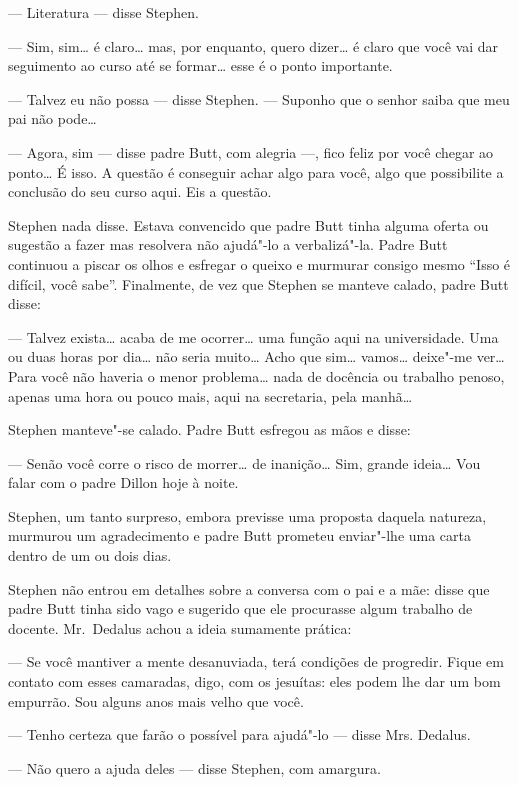 --- Literatura --- disse Stephen.

--- Sim, sim\ldots{} é claro\ldots{} mas, por enquanto, quero dizer\ldots{} é
claro que você vai dar seguimento ao curso até se formar\ldots{} esse é o
ponto importante.

--- Talvez eu não possa --- disse Stephen.  --- Suponho que o senhor
saiba que meu pai não pode\ldots{}

--- Agora, sim --- disse padre Butt, com alegria ---, fico feliz
por você chegar ao ponto\ldots{}  É isso.  A questão é conseguir achar algo
para você, algo que possibilite a conclusão do seu curso aqui.  Eis a
questão.

Stephen nada disse.  Estava convencido que padre Butt tinha alguma
oferta ou sugestão a fazer mas resolvera não ajudá"-lo a verbalizá"-la. 
Padre Butt continuou a piscar os olhos e esfregar o queixo e murmurar
consigo mesmo “Isso é difícil, você sabe”.  Finalmente, de vez que
Stephen se manteve calado, padre Butt disse:

--- Talvez exista\ldots{} acaba de me ocorrer\ldots{} uma função aqui na
universidade.  Uma ou duas horas por dia\ldots{} não seria muito\ldots{}  Acho
que sim\ldots{} vamos\ldots{} deixe"-me ver\ldots{}  Para você não haveria o menor
problema\ldots{} nada de docência ou trabalho penoso, apenas uma hora ou
pouco mais, aqui na secretaria, pela manhã\ldots{}

Stephen manteve"-se calado.  Padre Butt esfregou as mãos e disse:

--- Senão você corre o risco de morrer\ldots{} de inanição\ldots{}  Sim,
grande ideia\ldots{}  Vou falar com o padre Dillon hoje à noite.

Stephen, um tanto surpreso, embora previsse uma proposta daquela
natureza, murmurou um agradecimento e padre Butt prometeu enviar"-lhe
uma carta dentro de um ou dois dias.

Stephen não entrou em detalhes sobre a conversa com o pai e a mãe:
disse que padre Butt tinha sido vago e sugerido que ele procurasse
algum trabalho de docente.  Mr.~Dedalus achou a ideia sumamente
prática:

--- Se você mantiver a mente desanuviada, terá condições de
progredir.  Fique em contato com esses camaradas, digo, com os
jesuítas: eles podem lhe dar um bom empurrão.  Sou alguns anos mais
velho que você.

--- Tenho certeza que farão o possível para ajudá"-lo --- disse Mrs.
Dedalus.

--- Não quero a ajuda deles --- disse Stephen, com amargura.

